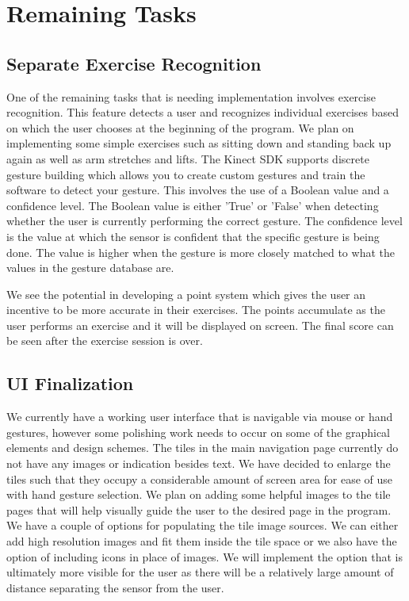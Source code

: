 \documentclass[onecolumn, draftclsnofoot,10pt, compsoc]{IEEEtran}
\begin{document}
\section{Remaining Tasks}
\subsection{Separate Exercise Recognition}
One of the remaining tasks that is needing implementation involves exercise recognition. This feature detects a user and recognizes individual exercises based on which the user chooses at the beginning of the program. We plan on implementing some simple exercises such as sitting down and standing back up again as well as arm stretches and lifts. The Kinect SDK supports discrete gesture building which allows you to create custom gestures and train the software to detect your gesture. This involves the use of a Boolean value and a confidence level. The Boolean value is either 'True' or 'False' when detecting whether the user is currently performing the correct gesture. The confidence level is the value at which the sensor is confident that the specific gesture is being done. The value is higher when the gesture is more closely matched to what the values in the gesture database are.

We see the potential in developing a point system which gives the user an incentive to be more accurate in their exercises. The points accumulate as the user performs an exercise and it will be displayed on screen. The final score can be seen after the exercise session is over.

\subsection{UI Finalization}
We currently have a working user interface that is navigable via mouse or hand gestures, however some polishing work needs to occur on some of the graphical elements and design schemes. The tiles in the main navigation page currently do not have any images or indication besides text. We have decided to enlarge the tiles such that they occupy a considerable amount of screen area for ease of use with hand gesture selection. We plan on adding some helpful images to the tile pages that will help visually guide the user to the desired page in the program. We have a couple of options for populating the tile image sources. We can either add high resolution images and fit them inside the tile space or we also have the option of including icons in place of images. We will implement the option that is ultimately more visible for the user as there will be a relatively large amount of distance separating the sensor from the user. 
\end{document}
